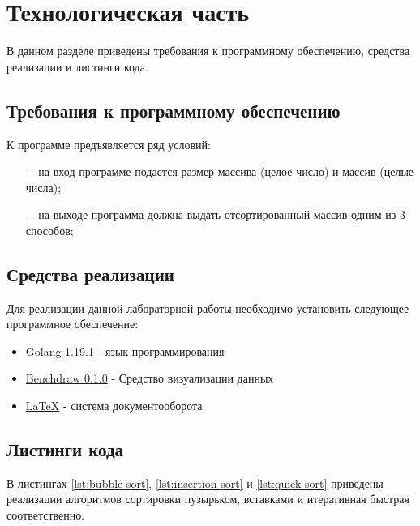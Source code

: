 \chapter{Технологическая часть}
В данном разделе приведены требования к программному обеспечению, средства реализации и листинги кода.

\section{Требования к программному обеспечению}
К программе предъявляется ряд условий:
\begin{itemize}
    \item[$-$] на вход программе подается размер массива (целое число) и массив (целые числа);
    \item [$-$] на выходе программа должна выдать отсортированный массив одним из 3 способов;
\end{itemize}

\section{Средства реализации}
Для реализации данной лабораторной работы необходимо установить следующее программное обеспечение:
\begin{itemize}
    \item \href{https://https://go.dev/}{Golang 1.19.1} - язык программирования
    \item \href{https://github.com/cep21/benchdraw}{Benchdraw 0.1.0} - Средство визуализации данных
    \item \href{https://www.latex-project.org/}{LaTeX} - система документооборота
\end{itemize}

\section{Листинги кода}
В листингах \ref{lst:bubble-sort}, \ref{lst:insertion-sort} и \ref{lst:quick-sort} приведены реализации алгоритмов
сортировки пузырьком, вставками и итеративная быстрая соответственно.




